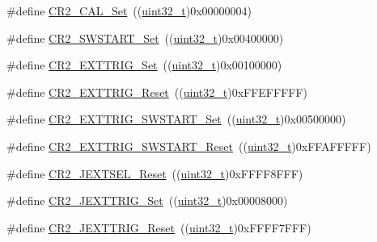 \begin{DoxyCompactItemize}
\item 
\#define \hyperlink{group___a_d_c___private___defines_ga6705aae168367a2d961e64dd9137ae3a}{C\+R2\+\_\+\+C\+A\+L\+\_\+\+Set}~((\hyperlink{_p_e___types_8h_a33594304e786b158f3fb30289278f5af}{uint32\+\_\+t})0x00000004)
\item 
\#define \hyperlink{group___a_d_c___private___defines_gac40733c6a8918c16cd52fcade75a6de6}{C\+R2\+\_\+\+S\+W\+S\+T\+A\+R\+T\+\_\+\+Set}~((\hyperlink{_p_e___types_8h_a33594304e786b158f3fb30289278f5af}{uint32\+\_\+t})0x00400000)
\item 
\#define \hyperlink{group___a_d_c___private___defines_gaf39824995dbcbabf76697cd7116352d6}{C\+R2\+\_\+\+E\+X\+T\+T\+R\+I\+G\+\_\+\+Set}~((\hyperlink{_p_e___types_8h_a33594304e786b158f3fb30289278f5af}{uint32\+\_\+t})0x00100000)
\item 
\#define \hyperlink{group___a_d_c___private___defines_ga8a96cb9aac77bab199f3dff54da230a6}{C\+R2\+\_\+\+E\+X\+T\+T\+R\+I\+G\+\_\+\+Reset}~((\hyperlink{_p_e___types_8h_a33594304e786b158f3fb30289278f5af}{uint32\+\_\+t})0x\+F\+F\+E\+F\+F\+F\+F\+F)
\item 
\#define \hyperlink{group___a_d_c___private___defines_gad9bed838631a650428d2318694a66094}{C\+R2\+\_\+\+E\+X\+T\+T\+R\+I\+G\+\_\+\+S\+W\+S\+T\+A\+R\+T\+\_\+\+Set}~((\hyperlink{_p_e___types_8h_a33594304e786b158f3fb30289278f5af}{uint32\+\_\+t})0x00500000)
\item 
\#define \hyperlink{group___a_d_c___private___defines_gad0a6e5cf09868318178434340ade2fe1}{C\+R2\+\_\+\+E\+X\+T\+T\+R\+I\+G\+\_\+\+S\+W\+S\+T\+A\+R\+T\+\_\+\+Reset}~((\hyperlink{_p_e___types_8h_a33594304e786b158f3fb30289278f5af}{uint32\+\_\+t})0x\+F\+F\+A\+F\+F\+F\+F\+F)
\item 
\#define \hyperlink{group___a_d_c___private___defines_gafa78c11893aa39ad2c0117414ae1704d}{C\+R2\+\_\+\+J\+E\+X\+T\+S\+E\+L\+\_\+\+Reset}~((\hyperlink{_p_e___types_8h_a33594304e786b158f3fb30289278f5af}{uint32\+\_\+t})0x\+F\+F\+F\+F8\+F\+F\+F)
\item 
\#define \hyperlink{group___a_d_c___private___defines_ga20a54958799c567e9efaa0635aa18a99}{C\+R2\+\_\+\+J\+E\+X\+T\+T\+R\+I\+G\+\_\+\+Set}~((\hyperlink{_p_e___types_8h_a33594304e786b158f3fb30289278f5af}{uint32\+\_\+t})0x00008000)
\item 
\#define \hyperlink{group___a_d_c___private___defines_ga94404d5a0103c5e2d7ffa45956356931}{C\+R2\+\_\+\+J\+E\+X\+T\+T\+R\+I\+G\+\_\+\+Reset}~((\hyperlink{_p_e___types_8h_a33594304e786b158f3fb30289278f5af}{uint32\+\_\+t})0x\+F\+F\+F\+F7\+F\+F\+F)
\item 

\end{DoxyCompactItemize}
